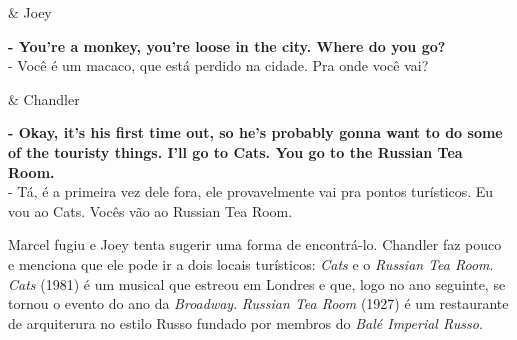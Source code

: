 \begin{tcolorbox}[enhanced,center upper,
    drop fuzzy shadow southeast, boxrule=0.3pt,
    lower separated=false, breakable,
    colframe=black!30!dialogoBorder,colback=white]
\begin{minipage}[c]{0.16\linewidth}
   & \centering \scriptsize{Joey}
\end{minipage}
\hfill
\begin{minipage}[c]{0.8\linewidth}
  \textbf{- You're a monkey, you're loose in the city. Where do you go?}\\
  - Você é um macaco, que está perdido na cidade. Pra onde você vai?
\end{minipage}

\medskip
\begin{minipage}[c]{0.16\linewidth}
   & \centering \scriptsize{Chandler}
\end{minipage}
\hfill
\begin{minipage}[c]{0.8\linewidth}
  \textbf{- Okay, it's his first time out, so he's probably gonna want to do some of the touristy things. I'll go to Cats. You go to the Russian Tea Room.}\\
  - Tá, é a primeira vez dele fora, ele provavelmente vai pra pontos turísticos. Eu vou ao Cats. Vocês vão ao Russian Tea Room.
\end{minipage}
\end{tcolorbox}

Marcel fugiu e Joey tenta sugerir uma forma de encontrá-lo. Chandler faz
pouco e menciona que ele pode ir a dois locais turísticos: \emph{Cats} e
o \emph{Russian Tea Room}. \emph{Cats} (1981) é um musical que estreou
em Londres e que, logo no ano seguinte, se tornou o evento do ano da
\emph{Broadway}. \emph{Russian Tea Room} (1927) é um restaurante de
arquiterura no estilo Russo fundado por membros do \emph{Balé Imperial
Russo}.

